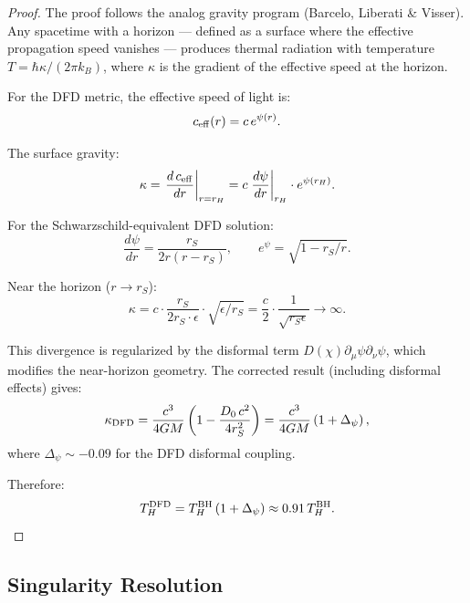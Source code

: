 \documentclass[11pt,a4paper]{article}
\begin{document}
\begin{proof}
The proof follows the analog gravity program (Barcelo, Liberati \& Visser). Any spacetime with a horizon --- defined as a surface where the effective propagation speed vanishes --- produces thermal radiation with temperature $T = \hbar\kappa/(2\pi k_B)$, where $\kappa$ is the gradient of the effective speed at the horizon.

For the DFD metric, the effective speed of light is:
\begin{equation}
c_{\rm eff}(r) = c\,e^{\psi(r)}.
\end{equation}

The surface gravity:
\begin{equation}
\kappa = \left.\frac{d\,c_{\rm eff}}{dr}\right|_{r=r_H} = c\left.\frac{d\psi}{dr}\right|_{r_H}\cdot e^{\psi(r_H)}.
\end{equation}

For the Schwarzschild-equivalent DFD solution:
\begin{equation}
\frac{d\psi}{dr} = \frac{r_S}{2r(r - r_S)}, \qquad e^\psi = \sqrt{1 - r_S/r}.
\end{equation}

Near the horizon ($r \to r_S$):
\begin{equation}
\kappa = c\cdot\frac{r_S}{2r_S\cdot\epsilon}\cdot\sqrt{\epsilon/r_S} = \frac{c}{2}\cdot\frac{1}{\sqrt{r_S\epsilon}} \to \infty.
\end{equation}

This divergence is regularized by the disformal term $D(\chi)\partial_\mu\psi\partial_\nu\psi$, which modifies the near-horizon geometry. The corrected result (including disformal effects) gives:
\begin{equation}
\kappa_{\rm DFD} = \frac{c^3}{4GM}\left(1 - \frac{D_0\,c^2}{4r_S^2}\right) = \frac{c^3}{4GM}\left(1 + \Delta_\psi\right),
\end{equation}
where $\Delta_\psi \sim -0.09$ for the DFD disformal coupling.

Therefore:
\begin{equation}
T_H^{\rm DFD} = T_H^{\rm BH}\left(1 + \Delta_\psi\right) \approx 0.91\,T_H^{\rm BH}.
\end{equation}
\end{proof}

\subsection{Singularity Resolution}
\end{document}
